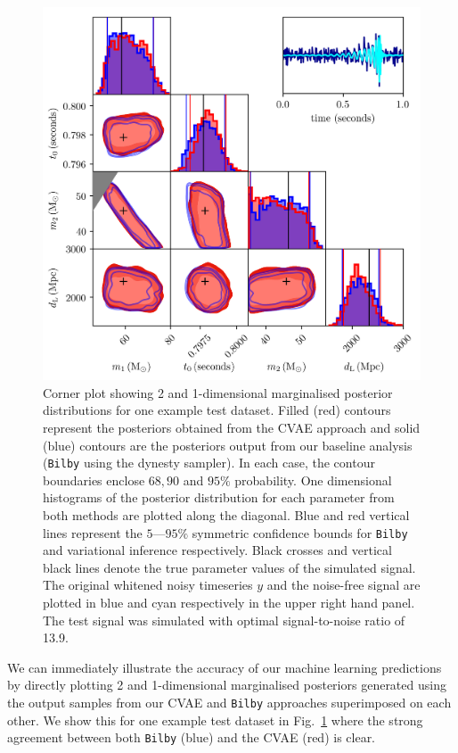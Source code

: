 %
%
\begin{figure}
    \includegraphics[width=\textwidth]{corner_testcase0.png}
    \caption[Corner plot showing 2 and 1-dimensional
marginalised posterior distributions for one example test dataset from \texttt{VItamin}.]{\label{fig:corner_plot} Corner plot showing 2 and 1-dimensional
marginalised posterior distributions for one example test dataset. Filled (red)
contours represent the posteriors obtained from the \ac{CVAE} approach and
solid (blue) contours are the posteriors output from our baseline analysis
(\texttt{Bilby} using the dynesty sampler). In each case, the contour boundaries
enclose $68,90$ and $95\%$ probability. One dimensional histograms of the
posterior distribution for each parameter from both methods are plotted along
the diagonal. Blue and red vertical lines represent the $5$---$95\%$ symmetric
confidence bounds for \texttt{Bilby} and variational inference respectively.
Black crosses and vertical black lines denote the true parameter values of the
simulated signal. The original whitened noisy timeseries $y$ and the noise-free
signal are plotted in blue and cyan respectively in the upper right hand
panel. The test signal was simulated with optimal signal-to-noise ratio of
13.9.}
\end{figure}

%
%
We can immediately illustrate the accuracy of our machine learning predictions
by directly plotting 2 and 1-dimensional marginalised posteriors generated
using the output samples from our \ac{CVAE} and \texttt{Bilby} approaches
superimposed on each other. We show this for one example test dataset in
Fig.~\ref{fig:corner_plot} where the strong agreement between both
\texttt{Bilby} (blue) and the \ac{CVAE} (red) is clear. 

